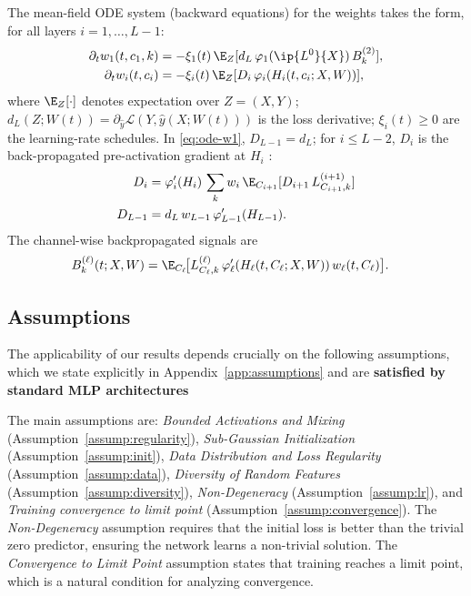\documentclass[nohyperref]{article}
\theoremstyle{plain}
\theoremstyle{definition}
\theoremstyle{remark}
\begin{document}
The mean-field ODE system (backward equations) for the weights takes the form, for all layers $i=1,\ldots,L-1$:
\begin{equation}
\begin{split}
\partial_t w_1(t,c_1,k) &= -\xi_1(t)\,\E_Z[d_L\,\varphi_1(\ip{L^0}{X})\,B_k^{(2)}], \\
\partial_t w_i(t,c_i) &= -\xi_i(t)\,\E_Z[D_i\,\varphi_i(H_i(t,c_i;X,W))],
\end{split}
\label{eq:ode-w1}
\end{equation}
where $\E_Z[\cdot]$ denotes expectation over $Z=(X,Y)$; $d_L(Z;W(t)) = \partial_{\hat{y}} \mathscr{L}(Y, \hat{y}(X;W(t)))$ is the loss derivative; $\xi_i(t) \ge 0$ are the learning-rate schedules. In \eqref{eq:ode-w1}, $D_{L-1}=d_L$; for $i \le L-2$, $D_i$ is the back-propagated pre-activation gradient at $H_i$ \cite{nguyen2023rigorousframeworkmeanfield}:
\begin{equation}
\label{eq:Di-recursion}
\begin{split}
D_i &= \varphi_i'(H_i)\,\sum_k w_i\,\E_{C_{i+1}}[ D_{i+1}\,L^{(i+1)}_{C_{i+1},k} ]\\
D_{L-1} &= d_L\,w_{L-1}\,\varphi_{L-1}'(H_{L-1}).
\end{split}
\end{equation}
The channel-wise backpropagated signals are
\begin{align*}
B_k^{(\ell)}(t;X,W) &= \E_{C_\ell}\!\big[L^{(\ell)}_{C_\ell,k}\,\varphi_\ell'(H_\ell(t,C_\ell;X,W))\,w_\ell(t,C_\ell)\big].
\end{align*}















\subsection{Assumptions}
\label{sec:assumptions}

The applicability of our results depends crucially on the following assumptions, which we state explicitly in Appendix~\ref{app:assumptions} and are \textbf{satisfied by standard MLP architectures}

The main assumptions are: \emph{Bounded Activations and Mixing} (Assumption~\ref{assump:regularity}), \emph{Sub-Gaussian Initialization} (Assumption~\ref{assump:init}), \emph{Data Distribution and Loss Regularity} (Assumption~\ref{assump:data}), \emph{Diversity of Random Features} (Assumption~\ref{assump:diversity}), \emph{Non-Degeneracy} (Assumption~\ref{assump:lr}), and \emph{Training convergence to limit point} (Assumption~\ref{assump:convergence}). The \emph{Non-Degeneracy} assumption requires that the initial loss is better than the trivial zero predictor, ensuring the network learns a non-trivial solution. The \emph{Convergence to Limit Point} assumption states that training reaches a limit point, which is a natural condition for analyzing convergence.
\end{document}

